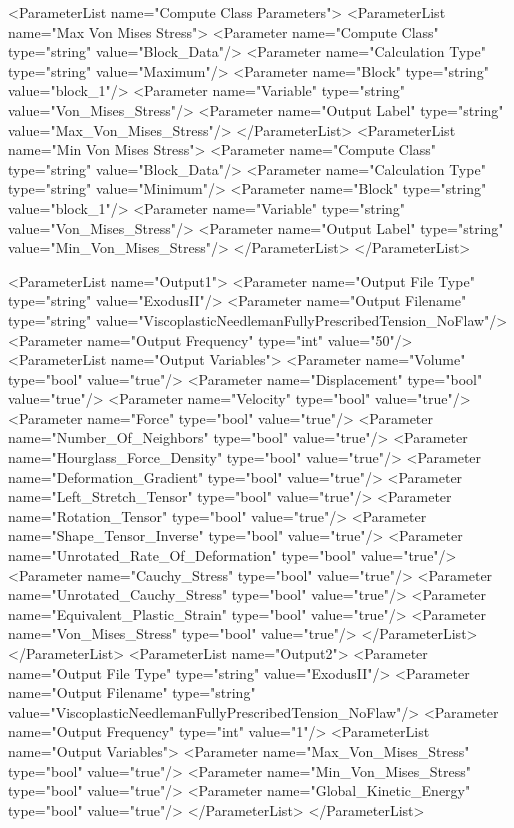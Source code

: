  \begin{code}
<ParameterList name="Compute Class Parameters">
     <ParameterList name="Max Von Mises Stress">
       <Parameter name="Compute Class" type="string" value="Block_Data"/>
       <Parameter name="Calculation Type" type="string" value="Maximum"/>
       <Parameter name="Block" type="string" value="block_1"/>
       <Parameter name="Variable" type="string" 
       value="Von_Mises_Stress"/>
       <Parameter name="Output Label" type="string" 
       value="Max_Von_Mises_Stress"/>
     </ParameterList>
     <ParameterList name="Min Von Mises Stress">
       <Parameter name="Compute Class" type="string" value="Block_Data"/>
       <Parameter name="Calculation Type" type="string" value="Minimum"/>
       <Parameter name="Block" type="string" value="block_1"/>
       <Parameter name="Variable" type="string" 
       value="Von_Mises_Stress"/>
       <Parameter name="Output Label" type="string" 
       value="Min_Von_Mises_Stress"/>
     </ParameterList>
</ParameterList>

<ParameterList name="Output1">
	<Parameter name="Output File Type" type="string" 
	value="ExodusII"/>
	<Parameter name="Output Filename" type="string" 
	value="ViscoplasticNeedlemanFullyPrescribedTension_NoFlaw"/>
	<Parameter name="Output Frequency" type="int" value="50"/>
	<ParameterList name="Output Variables">
          <Parameter name="Volume" type="bool" value="true"/>
          <Parameter name="Displacement" type="bool" value="true"/>
          <Parameter name="Velocity" type="bool" value="true"/>
          <Parameter name="Force" type="bool" value="true"/>
          <Parameter name="Number_Of_Neighbors" type="bool" 
          value="true"/>
          <Parameter name="Hourglass_Force_Density" type="bool" 
          value="true"/>
          <Parameter name="Deformation_Gradient" type="bool" 
          value="true"/>
          <Parameter name="Left_Stretch_Tensor" type="bool" 
          value="true"/>
          <Parameter name="Rotation_Tensor" type="bool" value="true"/>
          <Parameter name="Shape_Tensor_Inverse" type="bool" 
          value="true"/>
          <Parameter name="Unrotated_Rate_Of_Deformation" type="bool" 
          value="true"/>
          <Parameter name="Cauchy_Stress" type="bool" value="true"/>
          <Parameter name="Unrotated_Cauchy_Stress" type="bool" 
          value="true"/>
          <Parameter name="Equivalent_Plastic_Strain" type="bool" 
          value="true"/>
          <Parameter name="Von_Mises_Stress" type="bool" value="true"/>
         </ParameterList>
</ParameterList>
<ParameterList name="Output2">
	<Parameter name="Output File Type" type="string" 
	value="ExodusII"/>
	<Parameter name="Output Filename" type="string" 
	value="ViscoplasticNeedlemanFullyPrescribedTension_NoFlaw"/>
	<Parameter name="Output Frequency" type="int" value="1"/>
	<ParameterList name="Output Variables">
          <Parameter name="Max_Von_Mises_Stress" type="bool" 
          value="true"/>
          <Parameter name="Min_Von_Mises_Stress" type="bool" 
          value="true"/>
          <Parameter name="Global_Kinetic_Energy" type="bool" 
          value="true"/>
	</ParameterList>
</ParameterList>
\end{code}

